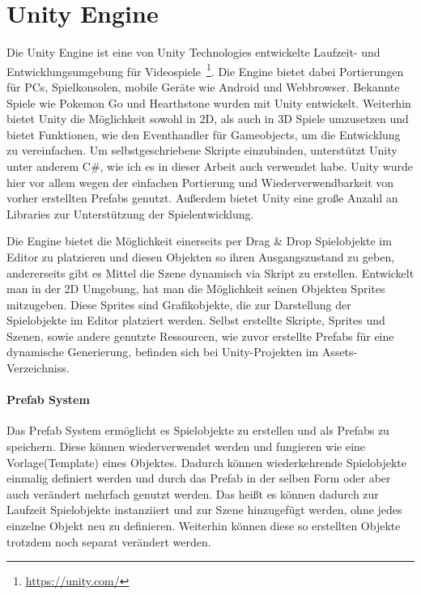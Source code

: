 \section{Unity Engine}
\label{ch:Grundlagen:sec:Unity}
Die Unity Engine ist eine von Unity Technologies entwickelte Laufzeit- und Entwicklungsumgebung für Videospiele~\footnote{\url{https://unity.com/}}. Die Engine bietet dabei Portierungen für PCs, Spielkonsolen, mobile Geräte wie Android und Webbrowser. Bekannte Spiele wie Pokemon Go und Hearthstone wurden mit Unity entwickelt. Weiterhin bietet Unity die Möglichkeit sowohl in 2D, als auch in 3D Spiele umzusetzen und bietet Funktionen, wie den Eventhandler für Gameobjects, um die Entwicklung zu vereinfachen. Um selbstgeschriebene Skripte einzubinden, unterstützt Unity unter anderem C\#, wie ich es in dieser Arbeit auch verwendet habe. Unity wurde hier vor allem wegen der einfachen Portierung und Wiederverwendbarkeit von vorher erstellten Prefabs genutzt. Außerdem bietet Unity eine große Anzahl an Libraries zur Unterstützung der Spielentwicklung. \par Die Engine bietet die Möglichkeit einerseits per Drag \& Drop Spielobjekte im Editor zu platzieren und diesen Objekten so ihren Ausgangszustand zu geben, andererseits gibt es Mittel die Szene dynamisch via Skript zu erstellen. Entwickelt man in der 2D Umgebung, hat man die Möglichkeit seinen Objekten Sprites mitzugeben. Diese Sprites sind Grafikobjekte, die zur Darstellung der Spielobjekte im Editor platziert werden. Selbst erstellte Skripte, Sprites und Szenen, sowie andere genutzte Ressourcen, wie zuvor erstellte Prefabs für eine dynamische Generierung, befinden sich bei Unity-Projekten im Assets-Verzeichniss.%

\paragraph{Prefab System}
\nocite{UPrefabs}
Das Prefab System ermöglicht es Spielobjekte zu erstellen und als Prefabs zu speichern. Diese können wiederverwendet werden und fungieren wie eine Vorlage(Template) eines Objektes. Dadurch können wiederkehrende Spielobjekte einmalig definiert werden und durch das Prefab in der selben Form oder aber auch verändert mehrfach genutzt werden. Das heißt es können dadurch zur Laufzeit Spielobjekte instanziiert und zur Szene hinzugefügt werden, ohne jedes einzelne Objekt neu zu definieren. Weiterhin können diese so erstellten Objekte trotzdem noch separat verändert werden. \nocite{UPrefabs}

